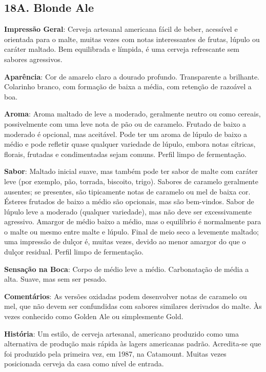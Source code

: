 \subsection*{18A. Blonde Ale}

\textbf{Impressão Geral}: Cerveja artesanal americana fácil de beber, acessível e orientada para o malte, muitas vezes com notas interessantes de frutas, lúpulo ou caráter maltado. Bem equilibrada e límpida, é uma cerveja refrescante sem sabores agressivos.

\textbf{Aparência}: Cor de amarelo claro a dourado profundo. Transparente a brilhante. Colarinho branco, com formação de baixa a média, com retenção de razoável a boa.

\textbf{Aroma}: Aroma maltado de leve a moderado, geralmente neutro ou como cereais, possivelmente com uma leve nota de pão ou de caramelo. Frutado de baixo a moderado é opcional, mas aceitável. Pode ter um aroma de lúpulo de baixo a médio e pode refletir quase qualquer variedade de lúpulo, embora notas cítricas, florais, frutadas e condimentadas sejam comuns. Perfil limpo de fermentação.

\textbf{Sabor}: Maltado inicial suave, mas também pode ter sabor de malte com caráter leve (por exemplo, pão, torrada, biscoito, trigo). Sabores de caramelo geralmente ausentes; se presentes, são tipicamente notas de caramelo ou mel de baixa cor. Ésteres frutados de baixo a médio são opcionais, mas são bem-vindos. Sabor de lúpulo leve a moderado (qualquer variedade), mas não deve ser excessivamente agressivo. Amargor de médio baixo a médio, mas o equilíbrio é normalmente para o malte ou mesmo entre malte e lúpulo. Final de meio seco a levemente maltado; uma impressão de dulçor é, muitas vezes, devido ao menor amargor do que o dulçor residual. Perfil limpo de fermentação.

\textbf{Sensação na Boca}: Corpo de médio leve a médio. Carbonatação de média a alta. Suave, mas sem ser pesado.

\textbf{Comentários}: As versões oxidadas podem desenvolver notas de caramelo ou mel, que não devem ser confundidas com sabores similares derivados do malte. Às vezes conhecido como Golden Ale ou simplesmente Gold.

\textbf{História}: Um estilo, de cerveja artesanal, americano produzido como uma alternativa de produção mais rápida às lagers americanas padrão. Acredita-se que foi produzido pela primeira vez, em 1987, na Catamount. Muitas vezes posicionada cerveja da casa como nível de entrada.

